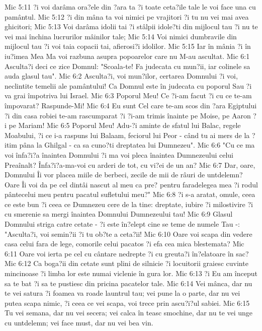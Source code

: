Mic 5:11  ?i voi darâma ora?ele din ?ara ta ?i toate ceta?ile tale le voi face una cu pamântul.
Mic 5:12  ?i din mâna ta voi nimici pe vrajitori ?i tu nu vei mai avea ghicitori;
Mic 5:13  Voi darâma idolii tai ?i stâlpii idole?ti din mijlocul tau ?i nu te vei mai închina lucrurilor mâinilor tale;
Mic 5:14  Voi nimici dumbravile din mijlocul tau ?i voi taia copacii tai, afierosi?i idolilor.
Mic 5:15  Iar în mânia ?i în iu?imea Mea Ma voi razbuna asupra popoarelor care nu M-au ascultat.
Mic 6:1  Asculta?i deci ce zice Domnul: "Scoala-te! Fa judecata cu mun?ii, iar colinele sa auda glasul tau".
Mic 6:2  Asculta?i, voi mun?ilor, certarea Domnului ?i voi, neclintite temelii ale pamântului! Ca Domnul este în judecata cu poporul Sau ?i va grai împotriva lui Israel.
Mic 6:3  Poporul Meu! Ce ?i-am facut ?i cu ce te-am împovarat? Raspunde-Mi!
Mic 6:4  Eu sunt Cel care te-am scos din ?ara Egiptului ?i din casa robiei te-am rascumparat ?i ?i-am trimis înainte pe Moise, pe Aaron ?i pe Mariam!
Mic 6:5  Poporul Meu! Adu-?i aminte de sfatul lui Balac, regele Moabului, ?i ce i-a raspuns lui Balaam, feciorul lui Peor - când tu ai mers de la ?itim pâna la Ghilgal - ca sa cuno?ti dreptatea lui Dumnezeu".
Mic 6:6  "Cu ce ma voi înfa?i?a înaintea Domnului ?i ma voi pleca înaintea Dumnezeului celui Preaînalt? Înfa?i?a-ma-voi cu arderi de tot, cu vi?ei de un an?
Mic 6:7  Dar, oare, Domnului Îi vor placea miile de berbeci, zecile de mii de râuri de untdelemn? Oare Îi voi da pe cel dintâi nascut al meu ca pre? pentru faradelegea mea ?i rodul pântecelui meu pentru pacatul sufletului meu?"
Mic 6:8  ?i s-a aratat, omule, ceea ce este bun ?i ceea ce Dumnezeu cere de la tine: dreptate, iubire ?i milostivire ?i cu smerenie sa mergi înaintea Domnului Dumnezeului tau!
Mic 6:9  Glasul Domnului striga catre cetate - ?i este în?elept cine se teme de numele Tau -: "Asculta?i, voi semin?ii ?i tu ob?te a ceta?ii!
Mic 6:10  Oare voi scapa din vedere casa celui fara de lege, comorile celui pacatos ?i efa cea mica blestemata?
Mic 6:11  Oare voi ierta pe cel cu cântare nedrepte ?i cu greuta?i în?elatoare în sac?
Mic 6:12  Ca boga?ii din cetate sunt plini de silnicie ?i locuitorii graiesc cuvinte mincinoase ?i limba lor este numai viclenie în gura lor.
Mic 6:13  ?i Eu am început sa te bat ?i sa te pustiesc din pricina pacatelor tale.
Mic 6:14  Vei mânca, dar nu te vei satura ?i foamea va roade launtrul tau; vei pune la o parte, dar nu vei putea scapa nimic, ?i ceea ce vei scapa, voi trece prin ascu?i?ul sabiei.
Mic 6:15  Tu vei semana, dar nu vei secera; vei calca în teasc smochine, dar nu te vei unge cu untdelemn; vei face must, dar nu vei bea vin.
